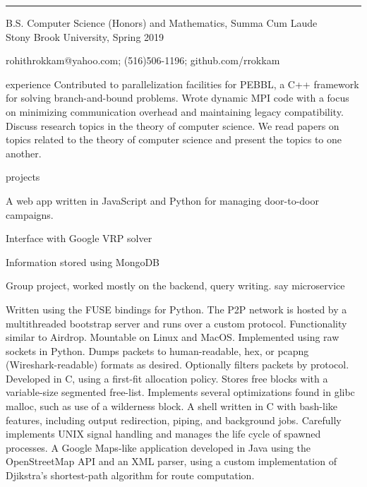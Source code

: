 \documentclass{cv}
\begin{document}
\rule{\textwidth}{0.4pt}
\begin{center}
B.S. Computer Science (Honors) and Mathematics, Summa Cum Laude \\
Stony Brook University, Spring 2019

rohithrokkam@yahoo.com; (516)506-1196; github.com/rrokkam 

\end{center}


\begin{entrylist}{experience}
    {Contributed to parallelization facilities for PEBBL, a C++ framework for solving branch-and-bound problems. Wrote dynamic MPI code with a focus on minimizing communication overhead and maintaining legacy compatibility.}
    {Discuss research topics in the theory of computer science. We read papers on topics related to the theory of computer science and present the topics to one another.}
\end{entrylist}

\begin{entrylist}{projects}
  {
    \item A web app written in JavaScript and Python for managing door-to-door campaigns. 
    \item Interface with Google VRP solver
    \item Information stored using MongoDB
    \item Group project, worked mostly on the backend, query writing. say microservice
  }
    {Written using the FUSE bindings for Python. The P2P network is hosted by a multithreaded bootstrap server and runs over a custom protocol. Functionality similar to Airdrop. Mountable on Linux and MacOS.}
    {Implemented using raw sockets in Python. Dumps packets to human-readable, hex, or pcapng (Wireshark-readable) formats as desired. Optionally filters packets by protocol.}
    {Developed in C, using a first-fit allocation policy. Stores free blocks with a variable-size segmented free-list. Implements several optimizations found in glibc malloc, such as use of a wilderness block.}
    {A shell written in C with bash-like features, including output redirection, piping, and background jobs. Carefully implements UNIX signal handling and manages the life cycle of spawned processes.}
    {A Google Maps-like application developed in Java using the OpenStreetMap API and an XML parser, using a custom implementation of Djikstra's shortest-path algorithm for route computation.}
\end{entrylist}
\end{document}
